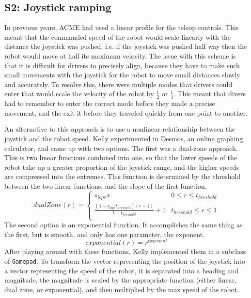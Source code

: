 \documentclass{article}
\begin{document}
\subsection{S2: Joystick ramping}

In previous years, ACME had used a linear profile for the teleop controls. This meant that the commanded speed of the robot would scale linearly with the distance the joystick was pushed, i.e. if the joystick was pushed half way then the robot would move at half its maximum velocity. The issue with this scheme is that it is difficult for drivers to precisely align, because they have to make such small movements with the joystick for the robot to move small distances slowly and accurately. To resolve this, there were multiple modes that drivers could enter that would scale the velocity of the robot by $\frac{1}{2}$ or $\frac{1}{4}$. This meant that divers had to remember to enter the correct mode before they made a precise movement, and the exit it before they traveled quickly from one point to another. 

An alternative to this approach is to use a nonlinear relationship between the joystick and the robot speed. Kelly experimented in Desmos, an online graphing calculator, and came up with two options. The first was a dual-zone approach. This is two linear functions combined into one, so that the lower speeds of the robot take up a greater proportion of the joystick range, and the higher speeds are compressed into the extremes. This function is determined by the threshold between the two linear functions, and the slope of the first function.
\begin{equation}
dualZone(r) = 
\begin{cases} 
      s_{lope}x & 0 \leq r \leq t_{hreshold}\\
      \frac{(1-s_{lope}t_{hreshold})(r-1)}{1-t_{hreshold}} +1& t_{hreshold} \leq r \leq 1 \\
  \end{cases}
\end{equation}
The second option is an exponential function. It accomplishes the same thing as the first, but is smooth, and only has one parameter, the exponent. 
\begin{equation}
    exponential(r) = r^{exponent}
\end{equation}
After playing around with these functions, Kelly implemented them in a subclass of \texttt{Gamepad}. To transform the vector representing the position of the joystick into a vector representing the speed of the robot, it is separated into a heading and magnitude, the magnitude is scaled by the appropriate function (either linear, dual zone, or exponential), and then multiplied by the max speed of the robot. 
\end{document}
